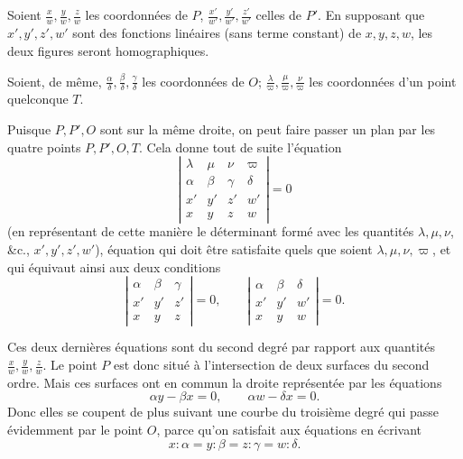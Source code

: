 \documentclass[11pt]{article}
\begin{document}
Soient $\frac{x}{w}, \frac{y}{w}, \frac{z}{w}$ les coordonn\'ees de $P$, $\frac{x'}{w'}, \frac{y'}{w'}, \frac{z'}{w'}$ celles de $P'$. En supposant que $x', y', z', w'$ sont des fonctions lin\'eaires (sans terme constant) de $x, y, z, w$, les deux figures seront homographiques.

Soient, de m\^eme, $\frac{\alpha}{\delta}, \frac{\beta}{\delta}, \frac{\gamma}{\delta}$ les coordonn\'ees de $O$; $\frac{\lambda}{\varpi}, \frac{\mu}{\varpi}, \frac{\nu}{\varpi}$ les coordonn\'ees d'un point quelconque $T$.

Puisque $P, P', O$ sont sur la m\^eme droite, on peut faire passer un plan par les quatre points $P, P', O, T$. Cela donne tout de suite l'\'equation
\[
\left| \begin{array}{cccc}
\lambda & \mu & \nu & \varpi\\
\alpha & \beta & \gamma & \delta\\
x' & y' & z' & w'\\
x & y & z & w
\end{array} \right| = 0
\]
(en repr\'esentant de cette mani\`ere le d\'eterminant form\'e avec les quantit\'es $\lambda, \mu, \nu$, \&c., $x', y', z', w'$),
\'equation qui doit \^etre satisfaite quels que soient $\lambda, \mu, \nu, \varpi$, et qui \'equivaut ainsi aux deux conditions
\[
\left| \begin{array}{ccc}
\alpha & \beta & \gamma\\
x' & y' & z'\\
x & y & z
\end{array} \right| = 0, \qquad
\left| \begin{array}{ccc}
\alpha & \beta & \delta\\
x' & y' & w'\\
x & y & w
\end{array} \right| = 0.
\]

Ces deux derni\`eres \'equations sont du second degr\'e par rapport aux quantit\'es $\frac{x}{w}, \frac{y}{w}, \frac{z}{w}$. Le point $P$ est donc situ\'e \`a l'intersection de deux surfaces du second ordre. Mais ces surfaces ont en commun la droite repr\'esent\'ee par les \'equations
\[
\alpha y - \beta x = 0, \qquad \alpha w - \delta x = 0.
\]
Donc elles se coupent de plus suivant une courbe du troisi\`eme degr\'e qui passe \'evidemment par le point $O$, parce qu'on satisfait aux \'equations en \'ecrivant
\[
x : \alpha = y : \beta = z : \gamma = w : \delta.
\]

\end{document}
